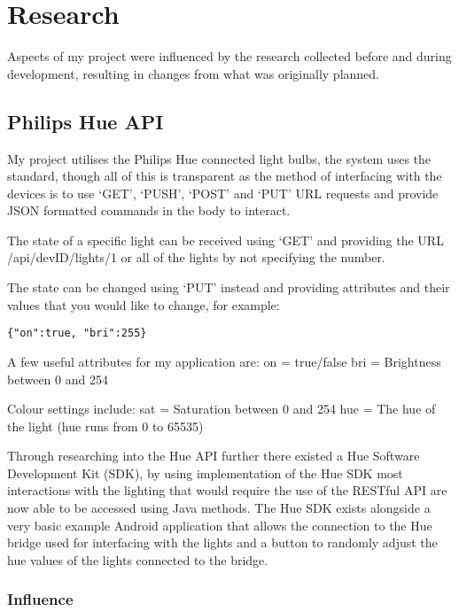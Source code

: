 \section{Research}\label{research}

Aspects of my project were influenced by the research collected before
and during development, resulting in changes from what was originally
planned.

\subsection{Philips Hue API}\label{philips-hue-api}

My project utilises the Philips Hue connected light bulbs, the
\cite{philipshue} system uses the \cite{zigbee} standard, though all of
this is transparent as the method of interfacing with the devices is to
use `GET', `PUSH', `POST' and `PUT' URL requests and provide JSON
formatted commands in the body to interact.

The state of a specific light can be received using `GET' and providing
the URL /api/devID/lights/1 or all of the lights by not specifying the
number.

The state can be changed using `PUT' instead and providing attributes
and their values that you would like to change, for example:

\begin{lstlisting}
{"on":true, "bri":255}
\end{lstlisting}

A few useful attributes for my application are: on = true/false bri =
Brightness between 0 and 254

Colour settings include: sat = Saturation between 0 and 254 hue = The
hue of the light (hue runs from 0 to 65535)

Through researching into the Hue API further there existed a Hue
Software Development Kit (SDK), by using implementation of the Hue SDK
most interactions with the lighting that would require the use of the
RESTful API are now able to be accessed using Java methods. The Hue SDK
exists alongside a very basic example Android application that allows
the connection to the Hue bridge used for interfacing with the lights
and a button to randomly adjust the hue values of the lights connected
to the bridge.

\subsubsection{Influence}\label{influence}

